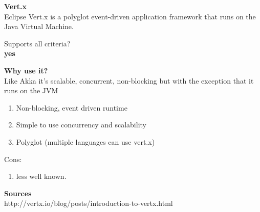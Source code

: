 
\textbf{Vert.x} \\
Eclipse Vert.x is a polyglot event-driven application framework that runs on the Java Virtual Machine.

Supports all criteria? \\
\textbf{yes}

\textbf{Why use it?} \\
 Like Akka it's scalable, concurrent, non-blocking but with the exception that it runs on the JVM\\

\begin{enumerate}
	\item Non-blocking, event driven runtime
	\item Simple to use concurrency and scalability
	\item Polyglot (multiple languages can use vert.x)
\end{enumerate}
Cons:
\begin{enumerate}
	\item less well known.
\end{enumerate}

\textbf{Sources}\\
http://vertx.io/blog/posts/introduction-to-vertx.html